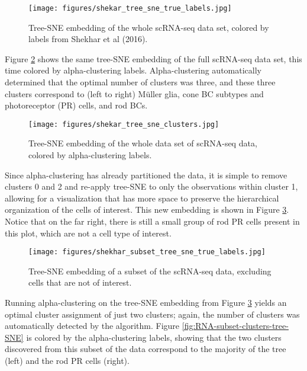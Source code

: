 \documentclass{article}
\begin{document}
\begin{figure}[htp]
    \centering
    \captionsetup{width=.9\linewidth}
    \texttt{[image: figures/shekar\_tree\_sne\_true\_labels.jpg]}
    \caption{Tree-SNE embedding of the whole scRNA-seq data set, colored by labels from Shekhar et al (2016).}
    \label{fig:RNA-full-tree-SNE}
\end{figure}

Figure \ref{fig:RNA-clusters-tree-SNE} shows the same tree-SNE embedding of the full scRNA-seq data set, this time colored by alpha-clustering labels. Alpha-clustering automatically determined that the optimal number of clusters was three, and these three clusters correspond to (left to right) Müller glia, cone BC subtypes and photoreceptor (PR) cells, and rod BCs. 

\begin{figure}[htp]
    \centering
    \captionsetup{width=.9\linewidth}
    \texttt{[image: figures/shekar\_tree\_sne\_clusters.jpg]}
    \caption{Tree-SNE embedding of the whole data set of scRNA-seq data, colored by alpha-clustering labels.}
    \label{fig:RNA-clusters-tree-SNE}
\end{figure}

Since alpha-clustering has already partitioned the data, it is simple to remove clusters 0 and 2 and re-apply tree-SNE to only the observations within cluster 1, allowing for a visualization that has more space to preserve the hierarchical organization of the cells of interest. This new embedding is shown in Figure \ref{fig:RNA-subset-tree-SNE}. Notice that on the far right, there is still a small group of rod PR cells present in this plot, which are not a cell type of interest. 

\begin{figure}[htp]
    \centering
    \captionsetup{width=.9\linewidth}
    \texttt{[image: figures/shekhar\_subset\_tree\_sne\_true\_labels.jpg]}
    \caption{Tree-SNE embedding of a subset of the scRNA-seq data, excluding cells that are not of interest.}
    \label{fig:RNA-subset-tree-SNE}
\end{figure}

Running alpha-clustering on the tree-SNE embedding from Figure \ref{fig:RNA-subset-tree-SNE} yields an optimal cluster assignment of just two clusters; again, the number of clusters was automatically detected by the algorithm. Figure \ref{fig:RNA-subset-clusters-tree-SNE} is colored by the alpha-clustering labels, showing that the two clusters discovered from this subset of the data correspond to the majority of the tree (left) and the rod PR cells (right). 
\end{document}
